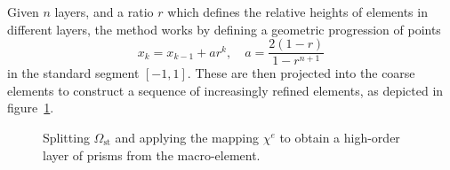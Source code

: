 Given $n$ layers, and a ratio $r$ which defines the relative heights of elements
in different layers, the method works by defining a geometric progression of
points
\[
x_k = x_{k-1} + ar^k, \quad a = \frac{2(1-r)}{1 - r^{n+1}}
\]
in the standard segment $[-1,1]$. These are then projected into the coarse
elements to construct a sequence of increasingly refined elements, as depicted
in figure~\ref{fig:util:mc:split}.

\begin{figure}
  \begin{center}
  \end{center}
  \caption{Splitting $\Omega_{\text{st}}$ and applying the mapping $\chi^e$ to
    obtain a high-order layer of prisms from the macro-element.}
  \label{fig:util:mc:split}
\end{figure}


